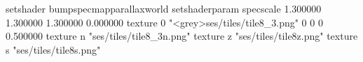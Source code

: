 setshader bumpspecmapparallaxworld
setshaderparam specscale 1.300000 1.300000 1.300000 0.000000
texture 0 "<grey>ses/tiles/tile8_3.png" 0 0 0 0.500000
texture n "ses/tiles/tile8_3n.png"
texture z "ses/tiles/tile8z.png"
texture s "ses/tiles/tile8s.png"

